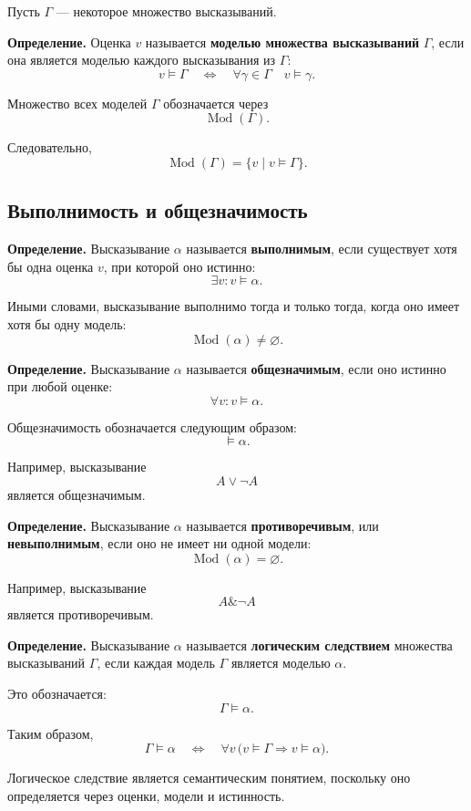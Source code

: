 \documentclass[12pt,a4paper,oneside,openany]{book}
\theoremstyle{definition}
\theoremstyle{plain}
\theoremstyle{remark}
\begin{document}
Пусть \(\Gamma\) --- некоторое множество высказываний.

\textbf{Определение.}
Оценка \(v\) называется \textbf{моделью множества высказываний}
\(\Gamma\), если она является моделью каждого высказывания из
\(\Gamma\):
\[
v\models\Gamma
\quad\Longleftrightarrow\quad
\forall\gamma\in\Gamma
\quad
v\models\gamma.
\]

Множество всех моделей \(\Gamma\) обозначается через
\[
\operatorname{Mod}(\Gamma).
\]

Следовательно,
\[
\operatorname{Mod}(\Gamma)
=
\{v\mid v\models\Gamma\}.
\]

\subsection{Выполнимость и общезначимость}

\textbf{Определение.}
Высказывание \(\alpha\) называется \textbf{выполнимым}, если существует
хотя бы одна оценка \(v\), при которой оно истинно:
\[
\exists v\colon v\models\alpha.
\]

Иными словами, высказывание выполнимо тогда и только тогда, когда оно
имеет хотя бы одну модель:
\[
\operatorname{Mod}(\alpha)\neq\varnothing.
\]

\textbf{Определение.}
Высказывание \(\alpha\) называется \textbf{общезначимым}, если оно
истинно при любой оценке:
\[
\forall v\colon v\models\alpha.
\]

Общезначимость обозначается следующим образом:
\[
\models\alpha.
\]

Например, высказывание
\[
A\lor\neg A
\]
является общезначимым.

\textbf{Определение.}
Высказывание \(\alpha\) называется \textbf{противоречивым}, или
\textbf{невыполнимым}, если оно не имеет ни одной модели:
\[
\operatorname{Mod}(\alpha)=\varnothing.
\]

Например, высказывание
\[
A\mathbin{\&}\neg A
\]
является противоречивым.
\vspace{5mm}


\textbf{Определение.}
Высказывание \(\alpha\) называется \textbf{логическим следствием}
множества высказываний \(\Gamma\), если каждая модель \(\Gamma\)
является моделью \(\alpha\).

Это обозначается:
\[
\Gamma\models\alpha.
\]

Таким образом,
\[
\Gamma\models\alpha
\quad\Longleftrightarrow\quad
\forall v\,
\bigl(
v\models\Gamma
\Rightarrow
v\models\alpha
\bigr).
\]

Логическое следствие является семантическим понятием, поскольку оно
определяется через оценки, модели и истинность.
\end{document}
